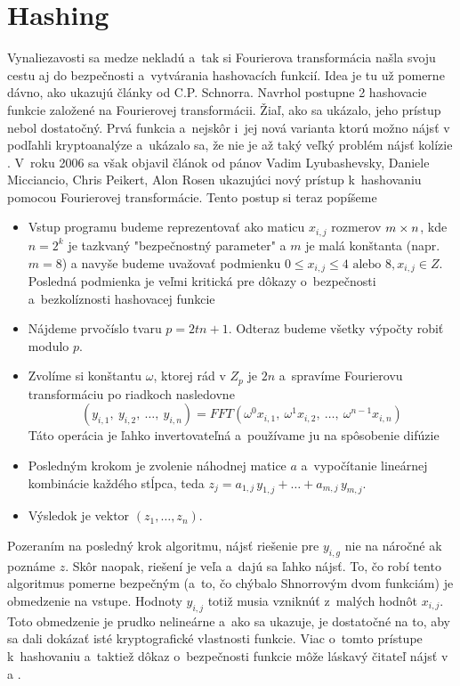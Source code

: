 \section{Hashing}

Vynaliezavosti sa medze nekladú a~tak si Fourierova transformácia
našla svoju cestu aj do bezpečnosti a~vytvárania hashovacích funkcií.
Idea je tu už pomerne dávno, ako ukazujú články od C.P. Schnorra.
Navrhol postupne 2 hashovacie funkcie založené na Fourierovej
transformácii. Žiaľ, ako sa ukázalo, jeho prístup nebol dostatočný.
Prvá funkcia a~nejskôr i~jej nová varianta ktorú možno nájsť v
\cite{schnorr} podľahli kryptoanalýze 
a~ukázalo sa, že nie je až taký veľký problém nájsť kolízie
\cite{ffthash_collisions}.
V~roku 2006 sa však objavil článok od pánov 
Vadim Lyubashevsky,
Daniele Micciancio,
Chris Peikert,
Alon Rosen ukazujúci nový prístup k~hashovaniu pomocou Fourierovej
transformácie. Tento postup si teraz popíšeme

\begin{itemize}
    \item Vstup programu budeme reprezentovať ako maticu $x_{i,j}$
    rozmerov $m\times n$, kde $n=2^k$ je tazkvaný "bezpečnostný
    parameter" a $m$ je malá konštanta (napr. $m=8$) a navyše budeme
    uvažovať podmienku $0\le x_{i,j}\le 4 \text{ alebo } 8, x_{i,j}\in Z$.
    Posledná podmienka je veľmi kritická pre dôkazy o~bezpečnosti 
    a~bezkolíznosti hashovacej funkcie
    \item Nájdeme prvočíslo tvaru $p=2tn+1$. Odteraz budeme všetky
    výpočty robiť modulo $p$.
    \item Zvolíme si konštantu $\omega$, ktorej rád v $Z_p$ je $2n$ 
    a~spravíme Fourierovu
    transformáciu po riadkoch nasledovne
    \begin{equation}
     (y_{i,1},\: y_{i,2},\: \dots,\: y_{i,n}) = FFT(
     \omega^0 x_{i,1},\: \omega^1 x_{i,2},\: \dots,\: \omega^{n-1}
     x_{i,n})
     \end{equation}
     Táto operácia je ľahko invertovateľná a~používame ju na
     spôsobenie difúzie
    \item
     Posledným krokom je zvolenie náhodnej matice $a$ a~vypočítanie
     lineárnej kombinácie každého stĺpca, teda
      $z_j = a_{1,j}\, y_{1,j} + \dots + a_{m,j}\, y_{m,j}$.
    \item
     Výsledok je vektor $(z_1, \dots, z_n)$.
\end{itemize}
Pozeraním na posledný krok algoritmu, nájsť riešenie pre 
 $y_{i,g}$ nie na náročné ak poznáme $z$. Skôr naopak, riešení je veľa 
 a~dajú sa ľahko nájsť.
 To, čo robí tento algoritmus pomerne bezpečným (a~to, čo chýbalo
 Shnorrovým dvom funkciám) je obmedzenie na vstupe.
 Hodnoty $y_{i,j}$ totiž musia vzniknúť z~malých hodnôt $x_{i,j}$.
 Toto obmedzenie je prudko nelineárne 
 a~ako sa ukazuje, je dostatočné na to, aby sa dali
 dokázať isté kryptografické vlastnosti funkcie.
 Viac o~tomto prístupe k~hashovaniu a~taktiež dôkaz o~bezpečnosti
 funkcie môže láskavý čitateľ nájsť v \cite{fft-hash} a
 \cite{fft-swifft}.

